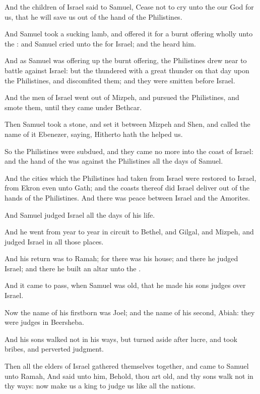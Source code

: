 \Verse And the children of Israel said to Samuel, Cease not to cry unto the \LORD our God for us, that he will save us out of the hand of the Philistines.

\Verse And Samuel took a sucking lamb, and offered it for a burnt offering wholly unto the \LORD: and Samuel cried unto the \LORD for Israel; and the \LORD heard him.

\Verse And as Samuel was offering up the burnt offering, the Philistines drew near to battle against Israel: but the \LORD thundered with a great thunder on that day upon the Philistines, and discomfited them; and they were smitten before Israel.

\Verse And the men of Israel went out of Mizpeh, and pursued the Philistines, and smote them, until they came under Bethcar.

\Verse Then Samuel took a stone, and set it between Mizpeh and Shen, and called the name of it Ebenezer, saying, Hitherto hath the \LORD helped us.

\Verse So the Philistines were subdued, and they came no more into the coast of Israel: and the hand of the \LORD was against the Philistines all the days of Samuel.

\Verse And the cities which the Philistines had taken from Israel were restored to Israel, from Ekron even unto Gath; and the coasts thereof did Israel deliver out of the hands of the Philistines. And there was peace between Israel and the Amorites.

\Verse And Samuel judged Israel all the days of his life.

\Verse And he went from year to year in circuit to Bethel, and Gilgal, and Mizpeh, and judged Israel in all those places.

\Verse And his return was to Ramah; for there was his house; and there he judged Israel; and there he built an altar unto the \LORD.


\Chapter
\Verse And it came to pass, when Samuel was old, that he made his sons judges over Israel.

\Verse Now the name of his firstborn was Joel; and the name of his second, Abiah: they were judges in Beersheba.

\Verse And his sons walked not in his ways, but turned aside after lucre, and took bribes, and perverted judgment.

\Verse Then all the elders of Israel gathered themselves together, and came to Samuel unto Ramah, \Verse And said unto him, Behold, thou art old, and thy sons walk not in thy ways: now make us a king to judge us like all the nations.

